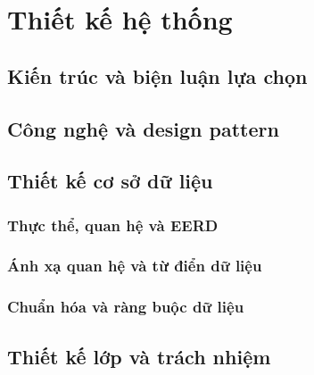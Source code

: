 \section{Thiết kế hệ thống}
\label{sec:design}

\subsection{Kiến trúc và biện luận lựa chọn}
\par\noindent\mbox{}\par\vspace{2mm}

\subsection{Công nghệ và design pattern}
\par\noindent\mbox{}\par\vspace{2mm}

\subsection{Thiết kế cơ sở dữ liệu}
\subsubsection{Thực thể, quan hệ và EERD}
\par\noindent\mbox{}\par\vspace{2mm}

\subsubsection{Ánh xạ quan hệ và từ điển dữ liệu}
\par\noindent\mbox{}\par\vspace{2mm}

\subsubsection{Chuẩn hóa và ràng buộc dữ liệu}
\par\noindent\mbox{}\par\vspace{2mm}

\subsection{Thiết kế lớp và trách nhiệm}
\par\noindent\mbox{}\par\vspace{2mm}


